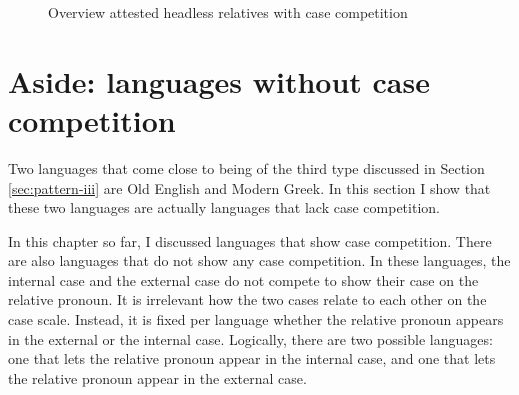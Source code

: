 \begin{figure}[H]
  \centering

    \caption{Overview attested headless relatives with case competition}
    \label{fig:attested-headless-relatives-case-competition}
\end{figure}




\section{Aside: languages without case competition}\label{sec:aside-potentiel-counterexamples}

Two languages that come close to being of the third type discussed in Section \ref{sec:pattern-iii} are Old English and Modern Greek. In this section I show that these two languages are actually languages that lack case competition.

In this chapter so far, I discussed languages that show case competition. There are also languages that do not show any case competition. In these languages, the internal case and the external case do not compete to show their case on the relative pronoun. It is irrelevant how the two cases relate to each other on the case scale. Instead, it is fixed per language whether the relative pronoun appears in the external or the internal case. Logically, there are two possible languages: one that lets the relative pronoun appear in the internal case, and one that lets the relative pronoun appear in the external case.

